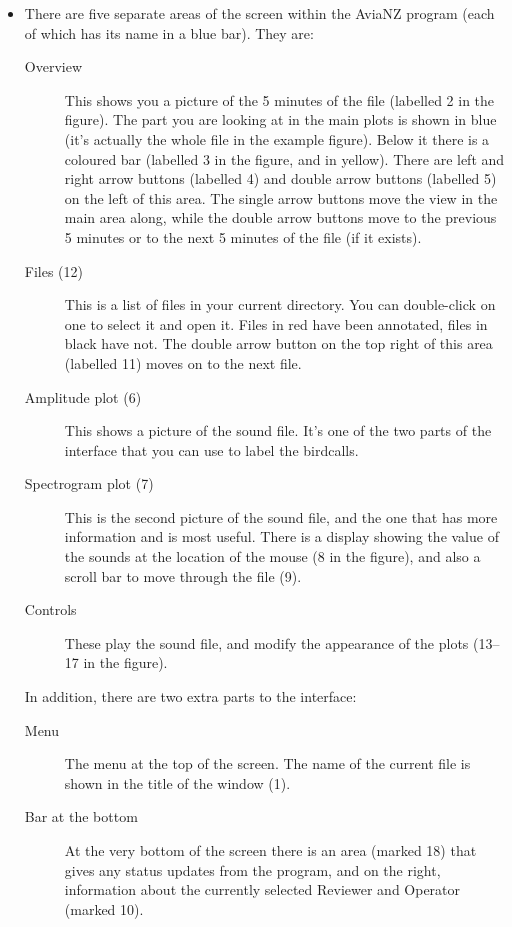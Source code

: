 \documentclass{article}
\begin{document}
\newpage
\begin{itemize}
\item There are five separate areas of the screen within the AviaNZ program (each of which has its name in a blue bar). They are:
	\begin{description}
	\item[Overview] This shows you a picture of the 5 minutes of the file (labelled 2 in the figure). The part you are looking at in the main plots is shown in blue (it's actually the whole file in the example figure). Below it there is a coloured bar (labelled 3 in the figure, and in yellow). There are left and right arrow buttons (labelled 4) and double arrow buttons (labelled 5) on the left of this area. The single arrow buttons move the view in the main area along, while the double arrow buttons move to the previous 5 minutes or to the next 5 minutes of the file (if it exists). 
	\item [Files (12)] This is a list of files in your current directory. You can double-click on one to select it and open it. Files in red have been annotated, files in black have not. The double arrow button on the top right of this area (labelled 11) moves on to the next file.
	\item[Amplitude plot (6)] This shows a picture of the sound file. It's one of the two parts of the interface that you can use to label the birdcalls. 
	\item[Spectrogram plot (7)] This is the second picture of the sound file, and the one that has more information and is most useful. There is a display showing the value of the sounds at the location of the mouse (8 in the figure), and also a scroll bar to move through the file (9). 
	\item[Controls] These play the sound file, and modify the appearance of the plots (13--17 in the figure).
	\end{description}

In addition, there are two extra parts to the interface:
	\begin{description}
	\item[Menu] The menu at the top of the screen. The name of the current file is shown in the title of the window (1).
	\item[Bar at the bottom] At the very bottom of the screen there is an area (marked 18) that gives any status updates from the program, and on the right, information about the currently selected Reviewer and Operator (marked 10).
	\end{description}


\end{itemize}
\end{document}
